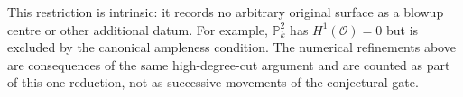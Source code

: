 This restriction is intrinsic: it records no arbitrary original
surface as a blowup centre or other additional datum.
For example, \(\mathbb P^2_k\) has \(H^1(\mathcal O)=0\)
but is excluded by the canonical ampleness condition.  The
numerical refinements above are consequences of the same
high-degree-cut argument and are counted as part of this one
reduction, not as successive movements of the conjectural gate.
